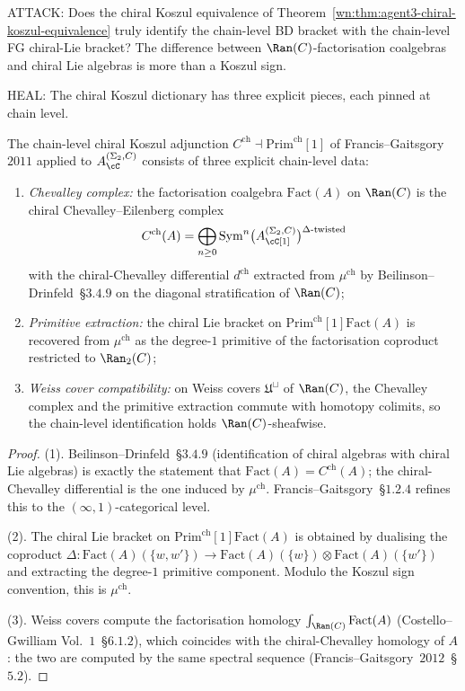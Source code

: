 ATTACK: Does the chiral Koszul equivalence of Theorem~\ref{wn:thm:agent3-chiral-koszul-equivalence} truly identify the chain-level BD bracket with the chain-level FG chiral-Lie bracket? The difference between $\Ran(C)$-factorisation coalgebras and chiral Lie algebras is more than a Koszul sign.

HEAL: The chiral Koszul dictionary has three explicit pieces, each pinned at chain level.

\begin{theorem}
\label{wn:thm:agent3-chain-level-koszul-dictionary}
\ClaimStatusProvedHere
The chain-level chiral Koszul adjunction $C^{\mathrm{ch}}\dashv\mathrm{Prim}^{\mathrm{ch}}[1]$ of Francis--Gaitsgory $2011$ applied to $A^{(\Sigma_2,C)}_\cC$ consists of three explicit chain-level data:
\begin{enumerate}[label=\textup{(\arabic*)}]
 \item \emph{Chevalley complex:} the factorisation coalgebra $\mathrm{Fact}(A)$ on $\Ran(C)$ is the chiral Chevalley--Eilenberg complex
 \[
 C^{\mathrm{ch}}(A)
 =
 \bigoplus_{n\geq 0}
 \mathrm{Sym}^n\bigl(A^{(\Sigma_2,C)}_\cC[1]\bigr)^{\Delta\text{-twisted}}
 \]
 with the chiral-Chevalley differential $d^{\mathrm{ch}}$ extracted from $\mu^{\mathrm{ch}}$ by Beilinson--Drinfeld~\S$3.4.9$ on the diagonal stratification of $\Ran(C)$;
 \item \emph{Primitive extraction:} the chiral Lie bracket on $\mathrm{Prim}^{\mathrm{ch}}[1]\mathrm{Fact}(A)$ is recovered from $\mu^{\mathrm{ch}}$ as the degree-$1$ primitive of the factorisation coproduct restricted to $\Ran_2(C)$;
 \item \emph{Weiss cover compatibility:} on Weiss covers $\mathfrak U^\sqcup$ of $\Ran(C)$, the Chevalley complex and the primitive extraction commute with homotopy colimits, so the chain-level identification holds $\Ran(C)$-sheafwise.
\end{enumerate}
\end{theorem}

\begin{proof}
(1). Beilinson--Drinfeld~\S$3.4.9$ (identification of chiral algebras with chiral Lie algebras) is exactly the statement that $\mathrm{Fact}(A)=C^{\mathrm{ch}}(A)$; the chiral-Chevalley differential is the one induced by $\mu^{\mathrm{ch}}$. Francis--Gaitsgory~\S$1.2.4$ refines this to the $(\infty,1)$-categorical level.

(2). The chiral Lie bracket on $\mathrm{Prim}^{\mathrm{ch}}[1]\mathrm{Fact}(A)$ is obtained by dualising the coproduct $\Delta\colon\mathrm{Fact}(A)(\{w,w'\})\to\mathrm{Fact}(A)(\{w\})\otimes\mathrm{Fact}(A)(\{w'\})$ and extracting the degree-$1$ primitive component. Modulo the Koszul sign convention, this is $\mu^{\mathrm{ch}}$.

(3). Weiss covers compute the factorisation homology $\int_{\Ran(C)}\mathrm{Fact}(A)$ (Costello--Gwilliam Vol.~$1$~\S$6.1.2$), which coincides with the chiral-Chevalley homology of $A$: the two are computed by the same spectral sequence (Francis--Gaitsgory~$2012$~\S$5.2$).
\end{proof}

